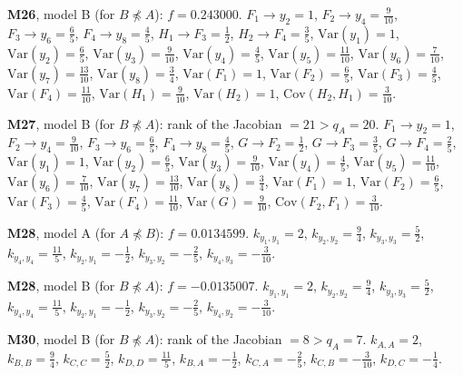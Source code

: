 \documentclass[10pt,a4paper]{article}
\newcommand{\nnest}{\not\preceq}
\begin{document}
{\noindent\textbf{M26}, model B (for $B\nnest A$): $f=0.243000$. {\footnotesize $F_{1}\to y_{2}=1$, $F_{2}\to y_{4}=\tfrac{9}{10}$, $F_{3}\to y_{6}=\tfrac{6}{5}$, $F_{4}\to y_{8}=\tfrac{4}{5}$, $H_{1}\to F_{3}=\tfrac{1}{2}$, $H_{2}\to F_{4}=\tfrac{3}{5}$, $\mathrm{Var}(y_{1})=1$, $\mathrm{Var}(y_{2})=\tfrac{6}{5}$, $\mathrm{Var}(y_{3})=\tfrac{9}{10}$, $\mathrm{Var}(y_{4})=\tfrac{4}{5}$, $\mathrm{Var}(y_{5})=\tfrac{11}{10}$, $\mathrm{Var}(y_{6})=\tfrac{7}{10}$, $\mathrm{Var}(y_{7})=\tfrac{13}{10}$, $\mathrm{Var}(y_{8})=\tfrac{3}{4}$, $\mathrm{Var}(F_{1})=1$, $\mathrm{Var}(F_{2})=\tfrac{6}{5}$, $\mathrm{Var}(F_{3})=\tfrac{4}{5}$, $\mathrm{Var}(F_{4})=\tfrac{11}{10}$, $\mathrm{Var}(H_{1})=\tfrac{9}{10}$, $\mathrm{Var}(H_{2})=1$, $\mathrm{Cov}(H_{2},H_{1})=\tfrac{3}{10}$.}\par\smallskip
\noindent\textbf{M27}, model B (for $B\nnest A$): rank of the Jacobian $=21>q_A=20$. {\footnotesize $F_{1}\to y_{2}=1$, $F_{2}\to y_{4}=\tfrac{9}{10}$, $F_{3}\to y_{6}=\tfrac{6}{5}$, $F_{4}\to y_{8}=\tfrac{4}{5}$, $G\to F_{2}=\tfrac{1}{2}$, $G\to F_{3}=\tfrac{3}{5}$, $G\to F_{4}=\tfrac{2}{5}$, $\mathrm{Var}(y_{1})=1$, $\mathrm{Var}(y_{2})=\tfrac{6}{5}$, $\mathrm{Var}(y_{3})=\tfrac{9}{10}$, $\mathrm{Var}(y_{4})=\tfrac{4}{5}$, $\mathrm{Var}(y_{5})=\tfrac{11}{10}$, $\mathrm{Var}(y_{6})=\tfrac{7}{10}$, $\mathrm{Var}(y_{7})=\tfrac{13}{10}$, $\mathrm{Var}(y_{8})=\tfrac{3}{4}$, $\mathrm{Var}(F_{1})=1$, $\mathrm{Var}(F_{2})=\tfrac{6}{5}$, $\mathrm{Var}(F_{3})=\tfrac{4}{5}$, $\mathrm{Var}(F_{4})=\tfrac{11}{10}$, $\mathrm{Var}(G)=\tfrac{9}{10}$, $\mathrm{Cov}(F_{2},F_{1})=\tfrac{3}{10}$.}\par\smallskip
\noindent\textbf{M28}, model A (for $A\nnest B$): $f=0.0134599$. {\footnotesize $k_{y_{1},y_{1}}=2$, $k_{y_{2},y_{2}}=\tfrac{9}{4}$, $k_{y_{3},y_{3}}=\tfrac{5}{2}$, $k_{y_{4},y_{4}}=\tfrac{11}{5}$, $k_{y_{2},y_{1}}=-\tfrac{1}{2}$, $k_{y_{3},y_{2}}=-\tfrac{2}{5}$, $k_{y_{4},y_{3}}=-\tfrac{3}{10}$.}\par\smallskip
\noindent\textbf{M28}, model B (for $B\nnest A$): $f=-0.0135007$. {\footnotesize $k_{y_{1},y_{1}}=2$, $k_{y_{2},y_{2}}=\tfrac{9}{4}$, $k_{y_{3},y_{3}}=\tfrac{5}{2}$, $k_{y_{4},y_{4}}=\tfrac{11}{5}$, $k_{y_{2},y_{1}}=-\tfrac{1}{2}$, $k_{y_{3},y_{2}}=-\tfrac{2}{5}$, $k_{y_{4},y_{2}}=-\tfrac{3}{10}$.}\par\smallskip
\noindent\textbf{M30}, model B (for $B\nnest A$): rank of the Jacobian $=8>q_A=7$. {\footnotesize $k_{A,A}=2$, $k_{B,B}=\tfrac{9}{4}$, $k_{C,C}=\tfrac{5}{2}$, $k_{D,D}=\tfrac{11}{5}$, $k_{B,A}=-\tfrac{1}{2}$, $k_{C,A}=-\tfrac{2}{5}$, $k_{C,B}=-\tfrac{3}{10}$, $k_{D,C}=-\tfrac{1}{4}$.}\par\smallskip
}
\end{document}
